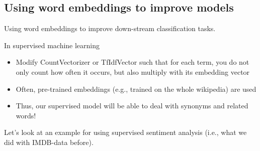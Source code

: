 \documentclass[compress]{beamer}
\begin{document}

\subsection[Improving down-stream classification tasks]{Using word embeddings to improve models}
\begin{frame}[plain]
	Using word embeddings to improve down-stream classification tasks.
\end{frame}

\begin{frame}{In supervised machine learning}
	\begin{itemize}[<+->]
		\item Modify CountVectorizer or TfIdfVector such that for each term, you do not only count how often it occurs, but also multiply with its embedding vector
		\item Often, pre-trained embeddings (e.g., trained on the whole wikipedia) are used
		\item Thus, our supervised model will be able to deal with synonyms and related words!
	\end{itemize}
	
	\pause 
	Let's look at an example for using supervised sentiment analysis (i.e., what we did with IMDB-data before).
	
	
\end{frame}
\end{document}
